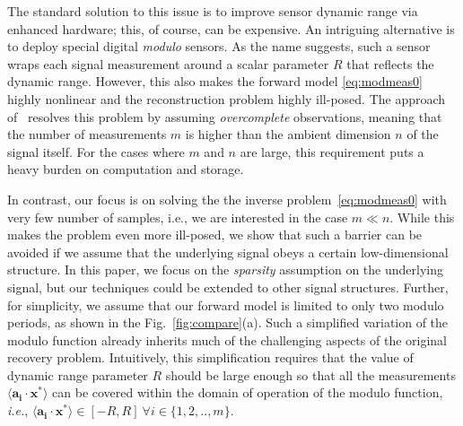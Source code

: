 The standard solution to this issue is to improve sensor dynamic range via enhanced hardware; this, of course, can be expensive. An intriguing alternative is to deploy special digital \emph{modulo} sensors. As the name suggests, such a sensor wraps each signal measurement around a scalar parameter $R$ that reflects the dynamic range. However, this also makes the forward model \eqref{eq:modmeas0} highly nonlinear and the reconstruction problem highly ill-posed. The approach of~\cite{Bhandari,ICCP15_Zhao} resolves this problem by assuming \emph{overcomplete} observations, meaning that the number of measurements $m$ is higher than the ambient dimension $n$ of the signal itself. For the cases where $m$ and $n$ are large, this requirement puts a heavy burden on computation and storage. 

In contrast, our focus is on solving the the inverse problem~\eqref{eq:modmeas0} with very few number of samples, {i.e.}, we are interested in the case $m \ll n$. While this makes the problem even more ill-posed, we show that such a barrier can be avoided if we assume that the underlying signal obeys a certain low-dimensional structure. In this paper, we focus on the \emph{sparsity} assumption on the underlying signal, but our techniques could be extended to other signal structures. Further, for simplicity, we assume that our forward model is limited to only two modulo periods, as shown in the Fig.~\ref{fig:compare}(a). Such a simplified variation of the modulo function already inherits much of the challenging aspects of the original recovery problem. Intuitively, this simplification requires that the value of dynamic range parameter $R$ should be large enough so that all the measurements $\langle \mathbf{a_i} \cdot \mathbf{x^*} \rangle$ can be covered within the domain of operation of the modulo function, \textit{i.e.}, $\langle \mathbf{a_i} \cdot \mathbf{x^*} \rangle \in [-R,R]~\forall i \in \{1,2,..,m\}$. 

